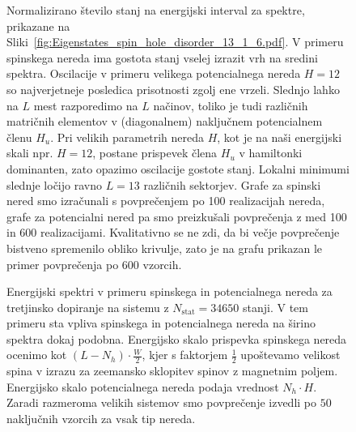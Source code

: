 \newpage
 \begin{figure}[H]
\caption{Normalizirano število stanj na energijski interval za spektre, prikazane na Sliki~\ref{fig:Eigenstates_spin_hole_disorder_13_1_6.pdf}. V primeru spinskega nereda ima gostota stanj vselej izrazit vrh na sredini spektra. Oscilacije v primeru velikega potencialnega nereda $H=12$ so najverjetneje posledica prisotnosti zgolj ene vrzeli. Slednjo lahko na $L$ mest razporedimo na $L$ načinov, toliko je tudi različnih matričnih elementov v (diagonalnem) naključnem potencialnem členu $H_u$. Pri velikih parametrih nereda $H$, kot je na naši energijski skali npr. $H=12$, postane prispevek člena $H_u$ v hamiltonki dominanten, zato opazimo oscilacije gostote stanj. Lokalni minimumi slednje ločijo ravno $L=13$ različnih sektorjev. Grafe za spinski nered smo izračunali s povprečenjem po 100 realizacijah nereda, grafe za potencialni nered pa smo preizkušali povprečenja z med 100 in 600 realizacijami. Kvalitativno se ne zdi, da bi večje povprečenje bistveno spremenilo obliko krivulje, zato je na grafu prikazan le primer povprečenja po 600 vzorcih.}
\label{fig:DOS_spin_hole_disorder_13_1_6.pdf}
\end{figure}
 \begin{figure}[H]
\caption{Energijski spektri v primeru spinskega in potencialnega nereda za tretjinsko dopiranje na sistemu z $N_\mathrm{stat}=34650$ stanji. V tem primeru sta vpliva spinskega in potencialnega nereda na širino spektra dokaj podobna. Energijsko skalo prispevka spinskega nereda ocenimo kot $(L-N_h)\cdot \frac{W}{2}$, kjer s faktorjem $\frac{1}{2}$ upoštevamo velikost spina v izrazu za zeemansko sklopitev spinov z magnetnim poljem. Energijsko skalo potencialnega nereda podaja vrednost $N_h\cdot H$. Zaradi razmeroma velikih sistemov smo povprečenje izvedli po $50$ naključnih vzorcih za vsak tip nereda.   }
\label{fig:Eigenstates_spin_hole_disorder_12_4_4.pdf}
\end{figure}
